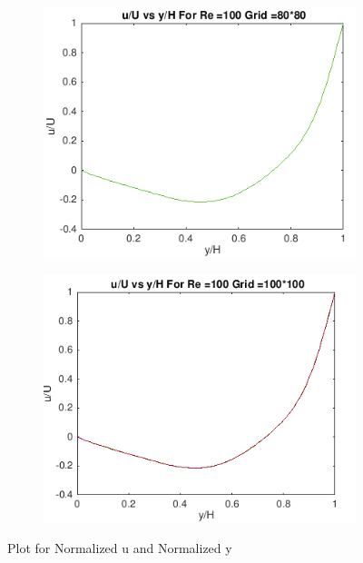 \documentclass{article}
\begin{document}
\begin{figure}
  \begin{subfigure}[b]{0.5\textwidth}
    \includegraphics[width=\textwidth]{11.png}
  \end{subfigure}
  \begin{subfigure}[b]{0.5\textwidth}
    \includegraphics[width=\textwidth]{12.png}
  \end{subfigure}
      \caption{Plot for Normalized u and Normalized y}
\label{fig:res3s}
\end{figure}
\end{document}

